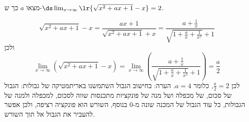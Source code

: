 מצאו $a$ כך ש-$\ds\lim_{x\to\infty}\lr{\sqrt{x^2+ax+1}-x}=2$.
\ifsol
\begin{solbox}
\[\sqrt{x^2+ax+1}-x=\frac{ax+1}{\sqrt{x^2+ax+1}+x}=\frac{a+\frac1x}{\sqrt{1+\frac ax+\frac1{x^2}}+1}\]
ולכן
\[\lim_{x\to\infty}\left(\sqrt{x^2+ax+1}-x\right)=\lim_{x\to\infty}\left(\frac{a+\frac1x}{\sqrt{1+\frac ax+\frac1{x^2}}+1}\right)=\frac a2\]
לכן $\frac a2=2$, כלומר $a=4$.
הערה: בחישוב הגבול השתמשנו באריתמטיקה של גבולות: הגבול של סכום, של מכפלה ושל מנה של פונקציות מתכנסות שווה לסכום, למכפלה ולמנה של הגבולות, כל עוד הגבול של המכנה שונה מ-$0$ בנוסף, השורש הוא פונקציה רציפה, ולכן אפשר להעביר את הגבול אל תוך השורש.
\end{solbox}
\fi
